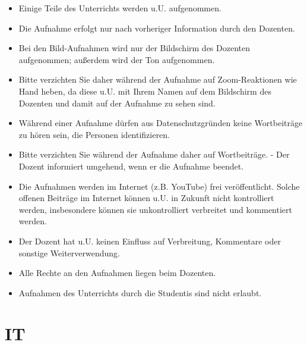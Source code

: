 \documentclass[
  a4paper,
  DIV=11]{scrreprt}
\providecommand{\tightlist}{%
  \setlength{\itemsep}{0pt}\setlength{\parskip}{0pt}}\usepackage{longtable,booktabs,array}
\theoremstyle{definition}
\theoremstyle{definition}
\theoremstyle{remark}
\begin{document}
\begin{itemize}
\tightlist
\item
  Einige Teile des Unterrichts werden u.U. aufgenommen.
\item
  Die Aufnahme erfolgt nur nach vorheriger Information durch den
  Dozenten.
\item
  Bei den Bild-Aufnahmen wird nur der Bildschirm des Dozenten
  aufgenommen; außerdem wird der Ton aufgenommen.
\item
  Bitte verzichten Sie daher während der Aufnahme auf Zoom-Reaktionen
  wie Hand heben, da diese u.U. mit Ihrem Namen auf dem Bildschirm des
  Dozenten und damit auf der Aufnahme zu sehen sind.
\item
  Während einer Aufnahme dürfen aus Datenschutzgründen keine
  Wortbeiträge zu hören sein, die Personen identifizieren.
\item
  Bitte verzichten Sie während der Aufnahme daher auf Wortbeiträge. -
  Der Dozent informiert umgehend, wenn er die Aufnahme beendet.
\item
  Die Aufnahmen werden im Internet (z.B. YouTube) frei veröffentlicht.
  Solche offenen Beiträge im Internet können u.U. in Zukunft nicht
  kontrolliert werden, insbesondere können sie unkontrolliert verbreitet
  und kommentiert werden.
\item
  Der Dozent hat u.U. keinen Einfluss auf Verbreitung, Kommentare oder
  sonstige Weiterverwendung.
\item
  Alle Rechte an den Aufnahmen liegen beim Dozenten.
\item
  Aufnahmen des Unterrichts durch die Studentis sind nicht erlaubt.
\end{itemize}

\hypertarget{it}{%
\section*{IT}\label{it}}

\end{document}
